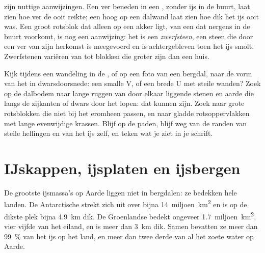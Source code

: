  zijn nuttige aanwijzingen. Een  ver beneden in een ,
zonder ijs in de buurt, laat zien hoe ver de  ooit reikte; een
 hoog op een dalwand laat zien hoe dik het ijs ooit was. Een groot
rotsblok dat alleen op een akker ligt, van een  dat nergens in de
buurt voorkomt, is nog een aanwijzing: het is een \emph{zwerfsteen}, een
steen die door een  ver van zijn herkomst is meegevoerd en is
achtergebleven toen het ijs smolt. Zwerfstenen variëren van  tot
blokken die groter zijn dan een huis.

\begin{inthefield}
Kijk tijdens een wandeling in de , of op een foto van een bergdal,
naar de vorm van het  in dwarsdoorsnede: een smalle V, of een brede U
met steile wanden? Zoek op de dalbodem naar lange ruggen van door elkaar
liggende stenen en aarde die langs de zijkanten of dwars door het 
lopen: dat kunnen  zijn. Zoek naar grote rotsblokken die niet bij
het  eromheen passen, en naar gladde rotsoppervlakken met lange
evenwijdige krassen. Blijf op de paden, blijf weg van de randen van steile
hellingen en van het ijs zelf, en teken wat je ziet in je schrift.
\end{inthefield}

\section{IJskappen, ijsplaten en ijsbergen}

De grootste ijsmassa's op Aarde liggen niet in bergdalen: ze bedekken
hele landen. De Antarctische  strekt zich uit over bijna
\num{14}~miljoen~\unit{km^2} en is op de dikste plek bijna \qty{4.9}{km}
dik. De Groenlandse  bedekt ongeveer \num{1.7}~miljoen~\unit{km^2},
vier vijfde van het eiland, en is meer dan \qty{3}{km} dik. Samen bevatten
ze meer dan 99~\% van het ijs op het land, en meer dan twee derde van al
het zoete water op Aarde.

